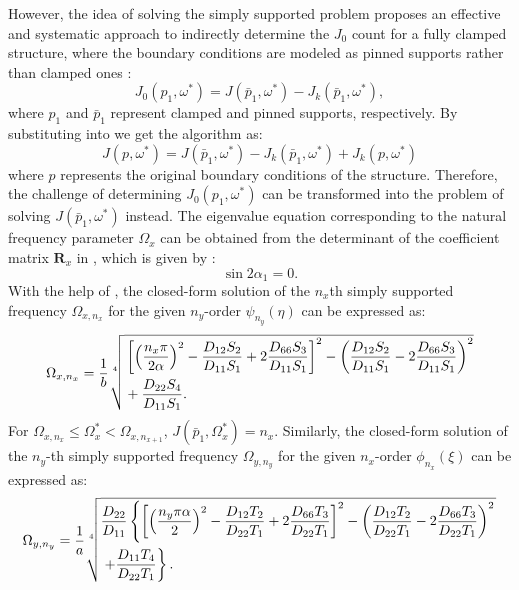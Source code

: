 \documentclass[preprint,12pt]{elsarticle}
\begin{document}
However, the idea of solving the simply supported problem proposes an effective and systematic approach to indirectly determine the \( J_0 \) count for a fully clamped structure, where the boundary conditions are modeled as pinned supports rather than clamped ones \cite{han2018improved}:
%
\begin{equation}\label{eq:J_o_pin}
	J_0(p_1,\omega^*) = J(\bar{p}_1,\omega^*) - J_k(\bar{p}_1,\omega^*),
\end{equation}
%
where \( p_1 \) and \( \bar{p}_1 \) represent clamped and pinned supports, respectively.
By substituting  into  we get the algorithm as:  
%
\begin{equation}\label{eq:new_WWalgorithm}
	J(p,\omega^*) = J(\bar{p}_1,\omega^*) - J_k(\bar{p}_1,\omega^*) + J_k(p,\omega^*)
\end{equation} 
%
where \( p \) represents the original boundary conditions of the structure.
Therefore, the challenge of determining \( J_0(p_1, \omega^*) \) can be transformed into the problem of solving \( J(\bar{p}_1, \omega^*) \) instead. The eigenvalue equation corresponding to the natural frequency parameter \( \Omega_x \) can be obtained from the determinant of the coefficient matrix \( \mathbf{R}_x \) in , which is given by \citep{xing2020extended}:
%
\begin{equation}\label{eq:SSx} 
	\sin 2\alpha_1 = 0.
\end{equation}
%
With the help of , the closed-form solution of the \(n_x\)th simply supported frequency \(\Omega_{x,n_x}\) for the given \(n_y\)-order \(\psi_{n_y}(\eta)\) can be expressed as:
%
\begin{equation}\label{eq:J_simpx}
	\Omega_{x,n_x} =
	\frac{1}{b} \sqrt[4]{%
		\begin{aligned}
			&\left[\left(\frac{n_x\pi}{2\alpha}\right)^2 - \frac{D_{12}S_2}{D_{11}S_1} + 2 \frac{D_{66}S_3}{D_{11}S_1}\right]^2 - \left(\frac{D_{12}S_2}{D_{11}S_1} - 2 \frac{D_{66}S_3}{D_{11}S_1}\right)^2 \\
			&+ \frac{D_{22}S_4}{D_{11}S_1}.
		\end{aligned}
	}
\end{equation}
%
For \(\Omega_{x,n_x} \leq \Omega_x^* < \Omega_{x,n_{x+1}}\), \(J(\bar{p}_1, \Omega_x^*) = n_x\).
Similarly, the closed-form solution of the \(n_y\)-th simply supported frequency \(\Omega_{y,n_y}\) for the given \(n_x\)-order \(\phi_{n_x}(\xi)\) can be expressed as:
%
\begin{equation}\label{eq:J_simpy}
	\Omega_{y,n_y}= 
	\frac{1}{a} \sqrt[4]{%
		\begin{aligned}
			&\frac{D_{22}}{D_{11}}\left\{\left[\left(\frac{n_y\pi\alpha}{2}\right)^2 - \frac{D_{12}T_2}{D_{22}T_1} + 2 \frac{D_{66}T_3}{D_{22}T_1}\right]^2 - \left(\frac{D_{12}T_2}{D_{22}T_1} - 2 \frac{D_{66}T_3}{D_{22}T_1}\right)^2\right. \\
			&\left.  + \frac{D_{11}T_4}{D_{22}T_1}\right\}.
		\end{aligned}
	}
\end{equation}
\end{document}
